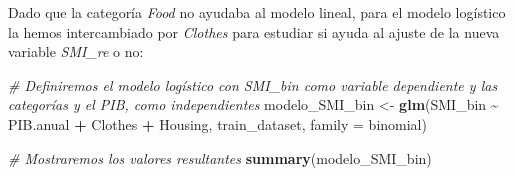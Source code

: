 \documentclass[
]{article}
\newenvironment{Shaded}{\begin{snugshade}}{\end{snugshade}}
\newcommand{\AttributeTok}[1]{\textcolor[rgb]{0.13,0.29,0.53}{#1}}
\newcommand{\CommentTok}[1]{\textcolor[rgb]{0.56,0.35,0.01}{\textit{#1}}}
\newcommand{\ConstantTok}[1]{\textcolor[rgb]{0.56,0.35,0.01}{#1}}
\newcommand{\DecValTok}[1]{\textcolor[rgb]{0.00,0.00,0.81}{#1}}
\newcommand{\FloatTok}[1]{\textcolor[rgb]{0.00,0.00,0.81}{#1}}
\newcommand{\FunctionTok}[1]{\textcolor[rgb]{0.13,0.29,0.53}{\textbf{#1}}}
\newcommand{\NormalTok}[1]{#1}
\newcommand{\OtherTok}[1]{\textcolor[rgb]{0.56,0.35,0.01}{#1}}
\newcommand{\SpecialCharTok}[1]{\textcolor[rgb]{0.81,0.36,0.00}{\textbf{#1}}}
\begin{document}
\begin{Shaded}
\end{Shaded}

Dado que la categoría \emph{Food} no ayudaba al modelo lineal, para el
modelo logístico la hemos intercambiado por \emph{Clothes} para estudiar
si ayuda al ajuste de la nueva variable \emph{SMI\_re} o no:

\begin{Shaded}
\begin{Highlighting}[]
\CommentTok{\# Definiremos el modelo logístico con SMI\_bin como variable dependiente y las categorías y el PIB, como independientes}
\NormalTok{modelo\_SMI\_bin }\OtherTok{\textless{}{-}} \FunctionTok{glm}\NormalTok{(SMI\_bin }\SpecialCharTok{\textasciitilde{}}\NormalTok{ PIB.anual }\SpecialCharTok{+}\NormalTok{ Clothes }\SpecialCharTok{+}\NormalTok{ Housing, train\_dataset, }\AttributeTok{family =}\NormalTok{ binomial)}

\CommentTok{\# Mostraremos los valores resultantes}
\FunctionTok{summary}\NormalTok{(modelo\_SMI\_bin)}
\end{Highlighting}
\end{Shaded}
\end{document}
